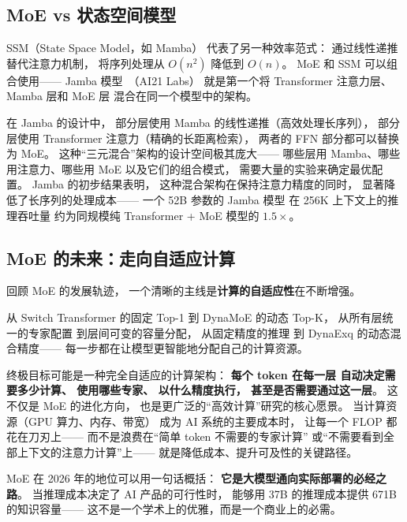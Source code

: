 \subsection{MoE vs 状态空间模型}

SSM（State Space Model，如 Mamba）
代表了另一种效率范式：
通过线性递推替代注意力机制，
将序列处理从 $O(n^2)$ 降低到 $O(n)$。
MoE 和 SSM 可以组合使用——
Jamba 模型~\cite{jamba2024}（AI21 Labs）%
就是第一个将 Transformer 注意力层、Mamba 层和 MoE 层
混合在同一个模型中的架构。

在 Jamba 的设计中，
部分层使用 Mamba 的线性递推（高效处理长序列），
部分层使用 Transformer 注意力（精确的长距离检索），
两者的 FFN 部分都可以替换为 MoE。
这种“三元混合”架构的设计空间极其庞大——
哪些层用 Mamba、哪些用注意力、哪些用 MoE
以及它们的组合模式，
需要大量的实验来确定最优配置。
Jamba 的初步结果表明，
这种混合架构在保持注意力精度的同时，
显著降低了长序列的处理成本——
一个 52B 参数的 Jamba 模型
在 256K 上下文上的推理吞吐量
约为同规模纯 Transformer + MoE 模型的 $1.5\times$。

\subsection{MoE 的未来：走向自适应计算}

回顾 MoE 的发展轨迹，
一个清晰的主线是\textbf{计算的自适应性}在不断增强。

从 Switch Transformer 的固定 Top-1
到 DynaMoE 的动态 Top-K，
从所有层统一的专家配置
到层间可变的容量分配，
从固定精度的推理
到 DynaExq 的动态混合精度——
每一步都在让模型更智能地分配自己的计算资源。

终极目标可能是一种完全自适应的计算架构：
\textbf{每个 token 在每一层
自动决定需要多少计算、
使用哪些专家、
以什么精度执行，
甚至是否需要通过这一层}。
这不仅是 MoE 的进化方向，
也是更广泛的“高效计算”研究的核心愿景。
当计算资源（GPU 算力、内存、带宽）
成为 AI 系统的主要成本时，
让每一个 FLOP 都花在刀刃上——
而不是浪费在“简单 token 不需要的专家计算”
或“不需要看到全部上下文的注意力计算”上——
就是降低成本、提升可及性的关键路径。

MoE 在 2026 年的地位可以用一句话概括：
\textbf{它是大模型通向实际部署的必经之路}。
当推理成本决定了 AI 产品的可行性时，
能够用 37B 的推理成本提供 671B 的知识容量——
这不是一个学术上的优雅，而是一个商业上的必需。

